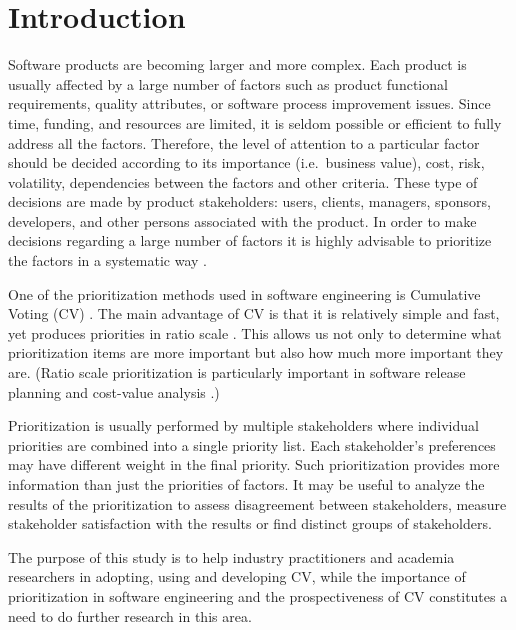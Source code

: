 \section{\label{intro}Introduction}

Software products are becoming larger and more complex. Each product
is usually affected by a large number of factors such as product functional
requirements, quality attributes, or software process improvement
issues. Since time, funding, and resources are limited, it is seldom
possible or efficient to fully address all the factors. Therefore,
the level of attention to a particular factor should be decided according
to its importance (i.e.\ business value), cost, risk, volatility, 
dependencies between the factors and other criteria. 
These type of decisions are made by product stakeholders:
users, clients, managers, sponsors, developers, and other persons
associated with the product. In order to make decisions regarding a
large number of factors it is highly advisable to prioritize the factors
in a systematic way \citep{Berander2005}.

One of the prioritization methods used in software engineering is Cumulative Voting (CV) \citep{Leffingwell1999}.
The main advantage of CV is that it is relatively simple and fast, yet produces priorities in ratio scale \citep{Berander2005,Ahl2005}.
This allows us not only to determine what prioritization items are more important but also how much more important they are.
(Ratio scale prioritization is particularly important in software release planning and cost-value analysis \citep{Berander2006a, Karlsson1997}.)

Prioritization is usually performed by multiple stakeholders 
where individual priorities are combined into a single priority list.
Each stakeholder's preferences may have different weight in the final priority.
Such prioritization provides more information than just the priorities of factors.
It may be useful to analyze the results of the prioritization to assess disagreement between stakeholders, measure stakeholder satisfaction with the results or find distinct groups of stakeholders.

The purpose of this study is to help industry practitioners and academia researchers in adopting, using and developing CV, while the importance of prioritization in software engineering and the prospectiveness of CV constitutes a need to do further research in this area.

